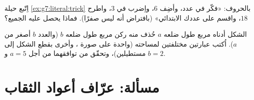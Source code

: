\begin{exercise}[$\star\star$]\label{exo:g7:literal:10}
اِتّبع حيلة \cref{ex:g7:literal:trick} بالحروف: «فكّر
في عدد، وأضِف $6$، واِضرب في $3$، واطرح $18$، واقسم على
عددك الابتدائي» (بافتراض أنه ليس صفرًا). فماذا يحصل عليه الجميع؟
\end{exercise}

\begin{exercise}[$\star\star\star$]\label{exo:g7:literal:11}
الشكل أدناه مربع طول ضلعه $a$ حُذف منه ركن مربع طول ضلعه
$b$ (والعدد $b$ أصغر من $a$). اُكتب عبارتين مختلفتين
لمساحته (واحدة على صورة ، وأخرى بقطع الشكل إلى مستطيلين)،
وتحقّق من توافقهما من أجل $a = 5$ و $b = 2$.
\end{exercise}

\section{مسألة: عرّاف أعواد الثقاب}

